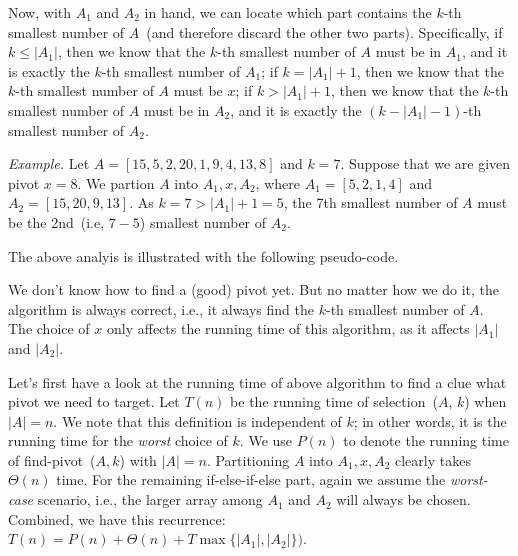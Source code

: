 Now, with $A_1$ and $A_2$ in hand, we can locate which part contains the $k$-th smallest number of $A$~(and therefore discard the other two parts).
Specifically, if $k \le |A_1|$, then we know that the $k$-th smallest number of $A$ must be in $A_1$,
and it is exactly the $k$-th smallest number of $A_1$;
if $k = |A_1| + 1$, then we know that the $k$-th smallest number of $A$ must be $x$;
if $k > |A_1| + 1$, then we know that the $k$-th smallest number of $A$ must be in $A_2$,
and it is exactly the $(k-|A_1|-1)$-th smallest number of $A_2$.

\emph{Example.} Let $A = [15, 5, 2, 20, 1, 9, 4, 13, 8]$ and $k = 7$.
Suppose that we are given pivot $x = 8$. We partion $A$ into $A_1, x, A_2$,
where $A_1 = [5, 2, 1, 4]$ and $A_2 = [15, 20, 9, 13]$.
As $k = 7 > |A_1| + 1 = 5$, the 7th smallest number of $A$
must be the 2nd~(i.e, $7-5$) smallest number of $A_2$.

The above analyis is illustrated with the following pseudo-code.

\begin{minipage}{0.8\textwidth}
	\xxx
	\aab {\textcolor{blue}{$x$ = find-pivot~($A$)};}\xxx
	\xxx
	\xxx
	\xxx
	\xxx
	\xxx
\end{minipage}

We don't know how to find a (good) pivot yet.
But no matter how we do it, the algorithm is always correct, i.e., it always find the $k$-th smallest number of $A$.
The choice of $x$ only affects the running time of this algorithm, as it affects $|A_1|$ and $|A_2|$.


Let's first have a look at the running time
of above algorithm to find a clue what pivot we need to target.
Let $T(n)$ be the running time of selection~($A$, $k$) when $|A| = n$. We note that this definition is independent of $k$;
in other words, it is the running time for the \emph{worst} choice of $k$.
We use $P(n)$ to denote the running time of find-pivot~($A,k$) with $|A| = n$.
Partitioning $A$ into $A_1,x,A_2$ clearly takes $\Theta(n)$ time.
For the remaining if-else-if-else part, again we assume the \emph{worst-case} scenario, i.e.,
the larger array among $A_1$ and $A_2$ will always be chosen.
Combined, we have this recurrence: $T(n) = P(n) + \Theta(n) + T\max\{|A_1|, |A_2|\})$.

